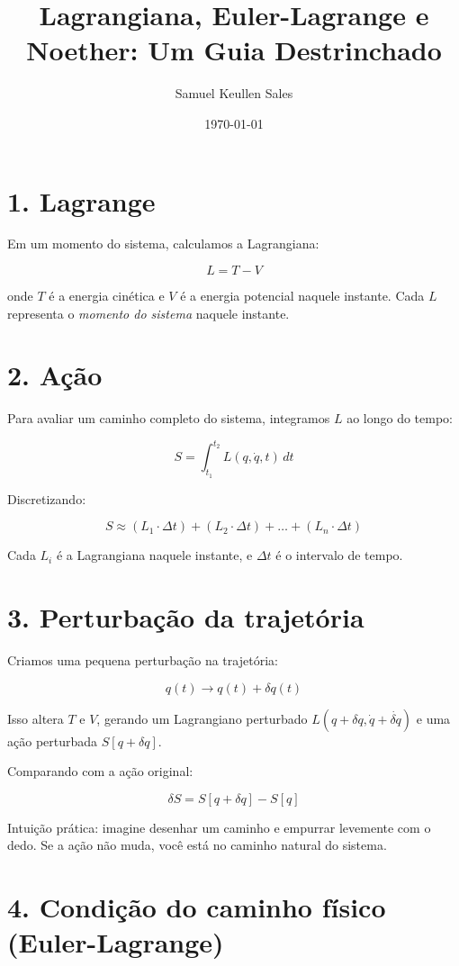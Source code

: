 \documentclass[12pt]{article}
\title{Lagrangiana, Euler-Lagrange e Noether: Um Guia Destrinchado}
\author{Samuel Keullen Sales}
\date{\today}
\begin{document}
\maketitle

\section*{1. Lagrange}

Em um momento do sistema, calculamos a Lagrangiana:

\[
L = T - V
\]

onde $T$ é a energia cinética e $V$ é a energia potencial naquele instante. Cada $L$ representa o \emph{momento do sistema} naquele instante.

\section*{2. Ação}

Para avaliar um caminho completo do sistema, integramos $L$ ao longo do tempo:

\[
S = \int_{t_1}^{t_2} L(q, \dot{q}, t) \, dt
\]

Discretizando:

\[
S \approx (L_1 \cdot \Delta t) + (L_2 \cdot \Delta t) + \dots + (L_n \cdot \Delta t)
\]

Cada $L_i$ é a Lagrangiana naquele instante, e $\Delta t$ é o intervalo de tempo.

\section*{3. Perturbação da trajetória}

Criamos uma pequena perturbação na trajetória:

\[
q(t) \to q(t) + \delta q(t)
\]

Isso altera $T$ e $V$, gerando um Lagrangiano perturbado $L(q+\delta q, \dot{q}+\dot{\delta q})$ e uma ação perturbada $S[q+\delta q]$.

Comparando com a ação original:

\[
\delta S = S[q + \delta q] - S[q]
\]

Intuição prática: imagine desenhar um caminho e empurrar levemente com o dedo. Se a ação não muda, você está no caminho natural do sistema.

\section*{4. Condição do caminho físico (Euler-Lagrange)}
\end{document}
